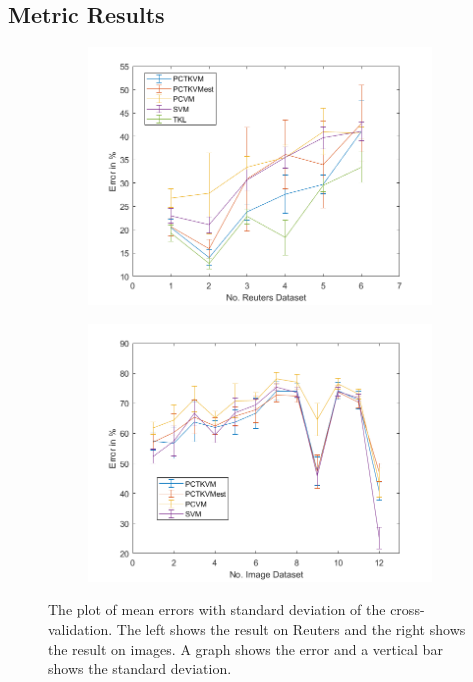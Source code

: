 \subsection{Metric Results}\label{EmSubSecMetricResult}
\begin{figure}
	\centering
	\begin{subfigure}{.5\textwidth}
		\centering
		\includegraphics[width=1\linewidth]{figures/PerformanceReuters.png}
		\caption{\label{FigErrorReu}}
	\end{subfigure}%
	\begin{subfigure}{.5\textwidth}
		\centering
		\includegraphics[width=1\linewidth]{figures/PerformanceImage.png}
		\caption{\label{FigErrorImg}}
	\end{subfigure}
	\caption[Plot of mean Error and standard Deviation]{The plot of mean errors with standard deviation of the cross-validation. The left shows the result on Reuters and the right shows the result on images. A graph shows the error and a vertical bar shows the standard deviation. \label{FigErrorDatasets}}
\end{figure}
